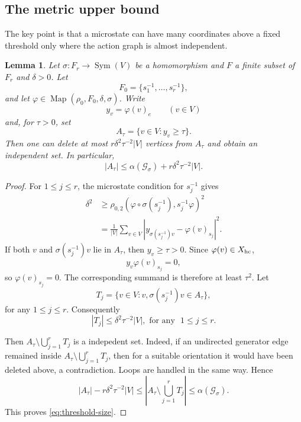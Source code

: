 \documentclass[12pt,a4paper]{amsart}
\newtheorem{lemma}[theorem]{Lemma}
\theoremstyle{definition}
\newcommand{\Map}{\operatorname{Map}}
\newcommand{\Sym}{\operatorname{Sym}}
\newcommand{\ind}{\alpha}
\newcommand{\cG}{\mathcal G}
\begin{document}
	\subsection{The metric upper bound}
	
	The key point is that a microstate can have many coordinates above a fixed threshold only where the action graph is almost independent.
	
	\begin{lemma}\label{lem:threshold}
		Let $\sigma:F_r\to\Sym(V)$ be a homomorphism and $F$ a finite subset of $F_r$ and $\delta>0$. Let
		\[
		F_0=\{s_1^{-1},\ldots,s_r^{-1}\},
		\]
		and let $\varphi\in\Map(\rho_0,F_0,\delta,\sigma)$.  Write
		\[
		y_v=\varphi(v)_e
		\qquad(v\in V)
		\]
		and, for $\tau>0$, set
		\[
		A_\tau=\{v\in V:y_v\ge\tau\}.
		\]
		Then one can delete at most $r\delta^2\tau^{-2}|V|$ vertices from $A_\tau$ and obtain an independent set.  In particular,
		\begin{equation}\label{eq:threshold-size}
			|A_\tau|
			\le \ind(\cG_\sigma)+r\delta^2\tau^{-2}|V|.
		\end{equation}
	\end{lemma}
	
	\begin{proof}
		
        For $1\le j\le r$, the microstate condition for $s_j^{-1}$ gives
		\begin{align*}
			\delta^2
			&\geq \rho_{0,2}(\varphi\circ\sigma(s_j^{-1}),s_j^{-1}\varphi)^2\\
			&=\frac1{|V|}\sum_{v\in V}
			\left|y_{\sigma(s_j^{-1})v}-\varphi(v)_{s_j}\right|^2.
		\end{align*}
		If both $v$ and $\sigma(s_j^{-1})v$ lie in $A_\tau$, then $y_v\ge\tau>0$.  Since $\varphi(v)\in X_{\rm hc}$,
		\[
		y_v\varphi(v)_{s_j}=0,
		\]
		so $\varphi(v)_{s_j}=0$.  The corresponding summand is therefore at least $\tau^2$.  Let
 \[ T_{j}=\{v\in V:v,\sigma(s_j^{-1})v\in A_\tau\},\]
 for any $1\leq j \leq r$.   Consequently
		\[
		\left|T_j\right|
    \le \delta^2\tau^{-2}|V|, \text{~for any ~} 1 \leq j \leq r.
		\]
		
Then $A_{\tau} \setminus \bigcup_{j=1}^{r}T_j$
is a indepedent set. Indeed, if an undirected generator edge remained inside $A_{\tau} \setminus \bigcup_{j=1}^{r}T_j$, then for a suitable orientation it would have been deleted above, a contradiction.  Loops are handled in the same way. Hence
        \[|A_{\tau}|-r \delta^2\tau^{-2}|V| \leq \left|A_{\tau} \setminus \bigcup_{j=1}^{r}T_j\right|\leq \ind(\cG_\sigma).\]
 This proves \eqref{eq:threshold-size}.
	\end{proof}
	
\end{document}
